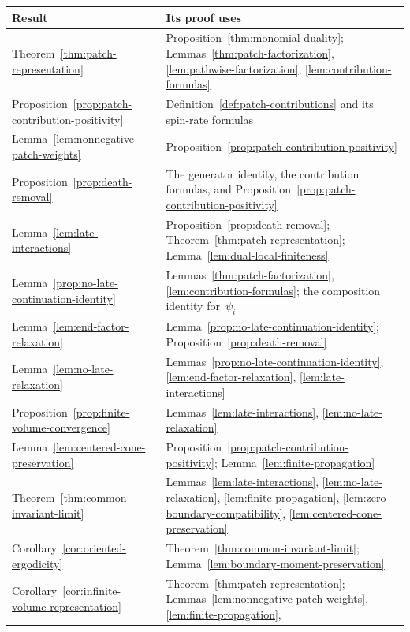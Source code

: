 \documentclass[EJP,preprint,NODS,nobera]{ejpecp}
\newcommand{\rev}[1]{{\color{red}#1}}
\begin{document}
\begin{table}[htbp]
\centering
\footnotesize
{\color{red}
\begin{tabularx}{\linewidth}{@{}lX@{}}
\hline
\rev{Result} & \rev{Its proof uses}\\
\hline
Theorem~\ref{thm:patch-representation} &
Proposition~\ref{thm:monomial-duality};
Lemmas~\ref{thm:patch-factorization}, \ref{lem:pathwise-factorization},
\ref{lem:contribution-formulas}\\
Proposition~\ref{prop:patch-contribution-positivity} &
Definition~\ref{def:patch-contributions} and its spin-rate formulas\\
Lemma~\ref{lem:nonnegative-patch-weights} &
Proposition~\ref{prop:patch-contribution-positivity}\\
Proposition~\ref{prop:death-removal} &
The generator identity, the contribution formulas, and
Proposition~\ref{prop:patch-contribution-positivity}\\
Lemma~\ref{lem:late-interactions} &
Proposition~\ref{prop:death-removal};
Theorem~\ref{thm:patch-representation};
Lemma~\ref{lem:dual-local-finiteness}\\
Lemma~\ref{prop:no-late-continuation-identity} &
Lemmas~\ref{thm:patch-factorization}, \ref{lem:contribution-formulas};
the composition identity for~$\psi_i$\\
Lemma~\ref{lem:end-factor-relaxation} &
Lemma~\ref{prop:no-late-continuation-identity};
Proposition~\ref{prop:death-removal}\\
Lemma~\ref{lem:no-late-relaxation} &
Lemmas~\ref{prop:no-late-continuation-identity}, \ref{lem:end-factor-relaxation},
\ref{lem:late-interactions}\\
Proposition~\ref{prop:finite-volume-convergence} &
Lemmas~\ref{lem:late-interactions}, \ref{lem:no-late-relaxation}\\
Lemma~\ref{lem:centered-cone-preservation} &
Proposition~\ref{prop:patch-contribution-positivity};
Lemma~\ref{lem:finite-propagation}\\
Theorem~\ref{thm:common-invariant-limit} &
Lemmas~\ref{lem:late-interactions}, \ref{lem:no-late-relaxation},
\ref{lem:finite-propagation}, \ref{lem:zero-boundary-compatibility},
\ref{lem:centered-cone-preservation}\\
Corollary~\ref{cor:oriented-ergodicity} &
Theorem~\ref{thm:common-invariant-limit};
Lemma~\ref{lem:boundary-moment-preservation}\\
Corollary~\ref{cor:infinite-volume-representation} &
Theorem~\ref{thm:patch-representation};
Lemmas~\ref{lem:nonnegative-patch-weights}, \ref{lem:finite-propagation},

\end{tabularx}}
\end{table}
\end{document}
